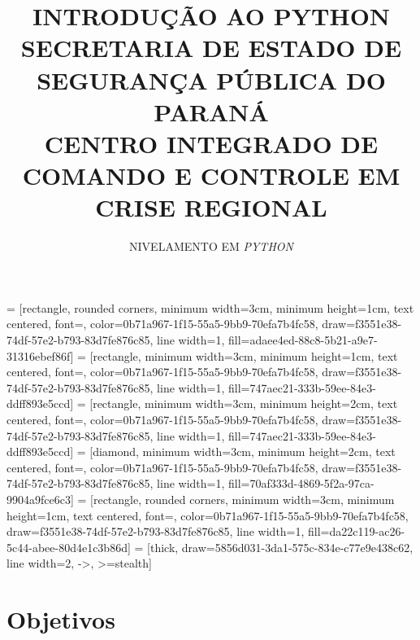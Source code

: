\documentclass[a4paper, 12pt, onecolumn,singlespacing]{article}
\title{INTRODUÇÃO AO PYTHON\\SECRETARIA DE ESTADO DE SEGURANÇA PÚBLICA DO PARANÁ\\CENTRO INTEGRADO DE COMANDO E CONTROLE EM CRISE REGIONAL}
\author[1]{NIVELAMENTO EM \textit{PYTHON}}
\affil[1]{EQUIPE TÉCNICA CICCR}
\begin{document}
	
	
	 = [rectangle, rounded corners, minimum width=3cm, minimum height=1cm, text centered, font=\normalsize, color=0b71a967-1f15-55a5-9bb9-70efa7b4fc58, draw=f3551e38-74df-57e2-b793-83d7fe876c85, line width=1, fill=adaee4ed-88c8-5b21-a9e7-31316ebef86f]
	 = [rectangle, minimum width=3cm, minimum height=1cm, text centered, font=\normalsize, color=0b71a967-1f15-55a5-9bb9-70efa7b4fc58, draw=f3551e38-74df-57e2-b793-83d7fe876c85, line width=1, fill=747aec21-333b-59ee-84e3-ddff893e5ccd]
	 = [rectangle, minimum width=3cm, minimum height=2cm, text centered, font=\normalsize, color=0b71a967-1f15-55a5-9bb9-70efa7b4fc58, draw=f3551e38-74df-57e2-b793-83d7fe876c85, line width=1, fill=747aec21-333b-59ee-84e3-ddff893e5ccd]
	 = [diamond, minimum width=3cm, minimum height=2cm, text centered, font=\normalsize, color=0b71a967-1f15-55a5-9bb9-70efa7b4fc58, draw=f3551e38-74df-57e2-b793-83d7fe876c85, line width=1, fill=70af333d-4869-5f2a-97ca-9904a9fce6c3]
	 = [rectangle, rounded corners, minimum width=3cm, minimum height=1cm, text centered, font=\normalsize, color=0b71a967-1f15-55a5-9bb9-70efa7b4fc58, draw=f3551e38-74df-57e2-b793-83d7fe876c85, line width=1, fill=da22c119-ac26-5c44-abee-80d4e1c3b86d]
	 = [thick, draw=5856d031-3da1-575c-834e-c77e9e438c62, line width=2, ->, >=stealth]
	
	
	\maketitle
	
	\section{Objetivos}
	\label{objetivos}
	
\end{document}
